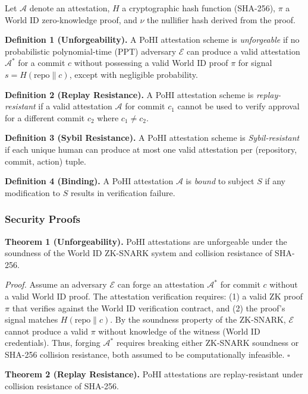 \documentclass[conference]{IEEEtran}
\begin{document}
Let $\mathcal{A}$ denote an attestation, $H$ a cryptographic hash function (SHA-256), $\pi$ a World ID zero-knowledge proof, and $\nu$ the nullifier hash derived from the proof.

\textbf{Definition 1 (Unforgeability).} A PoHI attestation scheme is \textit{unforgeable} if no probabilistic polynomial-time (PPT) adversary $\mathcal{E}$ can produce a valid attestation $\mathcal{A}^*$ for a commit $c$ without possessing a valid World ID proof $\pi$ for signal $s = H(\text{repo} \| c)$, except with negligible probability.

\textbf{Definition 2 (Replay Resistance).} A PoHI attestation scheme is \textit{replay-resistant} if a valid attestation $\mathcal{A}$ for commit $c_1$ cannot be used to verify approval for a different commit $c_2$ where $c_1 \neq c_2$.

\textbf{Definition 3 (Sybil Resistance).} A PoHI attestation scheme is \textit{Sybil-resistant} if each unique human can produce at most one valid attestation per (repository, commit, action) tuple.

\textbf{Definition 4 (Binding).} A PoHI attestation $\mathcal{A}$ is \textit{bound} to subject $S$ if any modification to $S$ results in verification failure.

\subsubsection{Security Proofs}

\textbf{Theorem 1 (Unforgeability).} PoHI attestations are unforgeable under the soundness of the World ID ZK-SNARK system \cite{zksnark} and collision resistance of SHA-256.

\textit{Proof.} Assume an adversary $\mathcal{E}$ can forge an attestation $\mathcal{A}^*$ for commit $c$ without a valid World ID proof. The attestation verification requires:
(1) a valid ZK proof $\pi$ that verifies against the World ID verification contract, and
(2) the proof's signal matches $H(\text{repo} \| c)$.
By the soundness property of the ZK-SNARK, $\mathcal{E}$ cannot produce a valid $\pi$ without knowledge of the witness (World ID credentials). Thus, forging $\mathcal{A}^*$ requires breaking either ZK-SNARK soundness or SHA-256 collision resistance, both assumed to be computationally infeasible. \hfill $\square$

\textbf{Theorem 2 (Replay Resistance).} PoHI attestations are replay-resistant under collision resistance of SHA-256.
\end{document}

